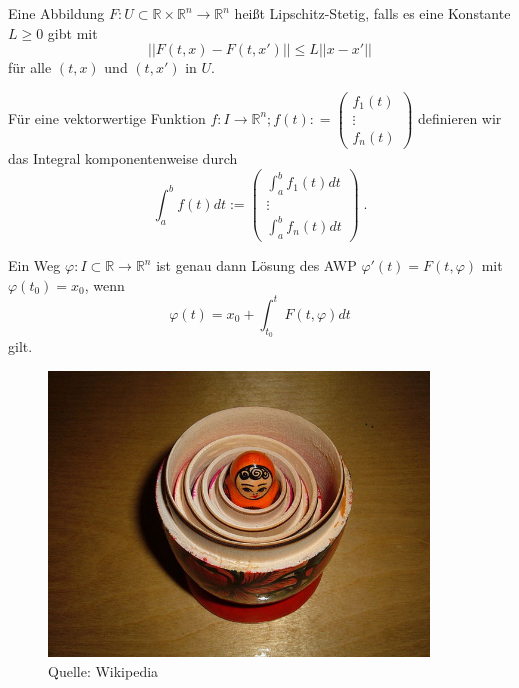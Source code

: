 \begin{Definition}
Eine  Abbildung $F : U \subset \mathbb{R} \times \mathbb{R}^n \to \mathbb{R}^n$ heißt Lipschitz-Stetig,
falls es eine Konstante $L \geq 0$ gibt  mit
$$ || F(t,x) - F(t,x') ||  \leq L || x -x' ||  $$
für alle $(t,x)$ und $(t,x')$ in $U$.
\end{Definition}

\begin{Definition}
Für eine  vektorwertige Funktion  $f : I   \to \mathbb{R}^n; f(t) : = \begin{pmatrix} f_1(t)  \\ \vdots \\ f_n(t) \end{pmatrix}$ definieren wir das Integral komponentenweise durch
$$\int_{a}^{b}  f(t) dt := \begin{pmatrix} \int_{a}^{b}  f_1(t) dt  \\ \vdots \\ \int_{a}^{b}  f_n(t) dt \end{pmatrix} \; .$$
\end{Definition}


\begin{Satz}
Ein Weg $\varphi : I \subset \mathbb{R} \to \mathbb{R}^n$ ist genau dann Lösung des AWP $\varphi'(t) = F(t , \varphi)$ mit $ \varphi(t_0)= x_0$, wenn
$$ \varphi(t) =  x_0 + \int_{t_0}^{t} F(t, \varphi) dt$$
gilt.
\end{Satz}



\begin{Satz}
\end{Satz}
\begin{figure}[H]
      \centering
    \includegraphics[width=0.9\textwidth]{images/640px-Floral_matryoshka_set_2_smallest_doll_nested.JPG}
\caption{Quelle: Wikipedia}
\end{figure}

